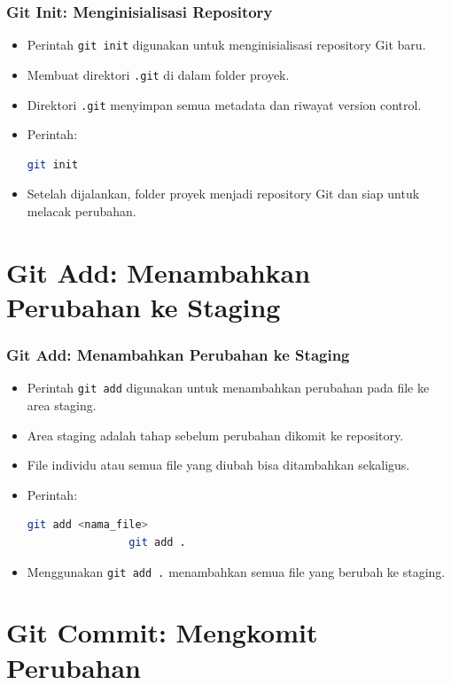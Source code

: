 \documentclass[aspectratio=169, table]{beamer}
\begin{document}
	\begin{frame}[fragile]
		\frametitle{Git Init: Menginisialisasi Repository}
		\vspace{15pt}
		\begin{itemize}
			\item Perintah \texttt{git init} digunakan untuk menginisialisasi repository Git baru.
			\item Membuat direktori \texttt{.git} di dalam folder proyek.
			\item Direktori \texttt{.git} menyimpan semua metadata dan riwayat version control.
			\item Perintah:
			\begin{lstlisting}[language=bash]
				git init
			\end{lstlisting}
			\item Setelah dijalankan, folder proyek menjadi repository Git dan siap untuk melacak perubahan.
		\end{itemize}
	\end{frame}
	
	\section{Git Add: Menambahkan Perubahan ke Staging}
	
	\begin{frame}[fragile]
		\frametitle{Git Add: Menambahkan Perubahan ke Staging}
		\vspace{15pt}
		\begin{itemize}
			\item Perintah \texttt{git add} digunakan untuk menambahkan perubahan pada file ke area staging.
			\item Area staging adalah tahap sebelum perubahan dikomit ke repository.
			\item File individu atau semua file yang diubah bisa ditambahkan sekaligus.
			\item Perintah:
			\begin{lstlisting}[language=bash]
				git add <nama_file>
				git add .
			\end{lstlisting}
			\item Menggunakan \texttt{git add .} menambahkan semua file yang berubah ke staging.
		\end{itemize}
	\end{frame}
	
	\section{Git Commit: Mengkomit Perubahan}
	
\end{document}

